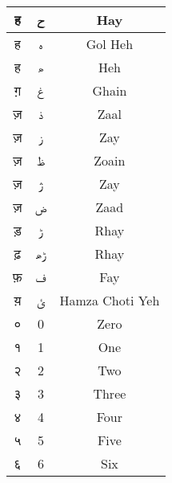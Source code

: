\begin{longtable}[c]{|c|c|c|}
\textsanskrit{ह}               & \texturdu{ح}            & Hay                         \\ \hline
\textsanskrit{ह}               & \texturdu{ہ}            & Gol Heh                     \\ \hline
\textsanskrit{ह}               & \texturdu{ھ}            & Heh                         \\ \hline
\textsanskrit{ग़}               & \texturdu{غ}            & Ghain                       \\ \hline
\textsanskrit{ज़}               & \texturdu{ذ}            & Zaal                        \\ \hline
\textsanskrit{ज़}               & \texturdu{ز}            & Zay                         \\ \hline
\textsanskrit{ज़}               & \texturdu{ظ}            & Zoain                       \\ \hline
\textsanskrit{ज़}               & \texturdu{ژ}            & Zay                         \\ \hline
\textsanskrit{ज़}               & \texturdu{ض}            & Zaad                        \\ \hline
\textsanskrit{ड़}               & \texturdu{ڑ}            & Rhay                        \\ \hline
\textsanskrit{ढ़}               & \texturdu{ڑھ‍}          & Rhay                        \\ \hline
\textsanskrit{फ़}               & \texturdu{ف}            & Fay                         \\ \hline
\textsanskrit{य़}               & \texturdu{ئ}            & Hamza Choti Yeh             \\ \hline
\textsanskrit{०}               & 0            & Zero                 \\ \hline
\textsanskrit{१}               & 1            & One                  \\ \hline
\textsanskrit{२}               & 2            & Two                  \\ \hline
\textsanskrit{३}               & 3            & Three                \\ \hline
\textsanskrit{४}               & 4            & Four                 \\ \hline
\textsanskrit{५}               & 5            & Five                 \\ \hline
\textsanskrit{६}               & 6            & Six                  \\ \hline

\end{longtable}
